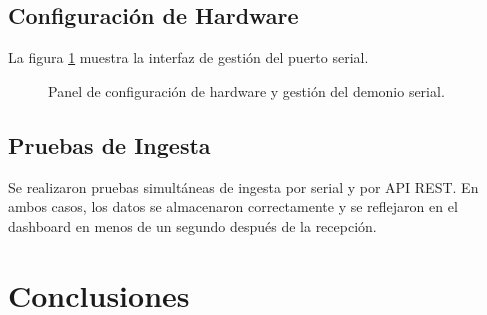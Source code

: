 \documentclass[12pt,a4paper]{report}
\begin{document}
\section{Configuración de Hardware}
\label{sec:resultado-hardware}

La figura \ref{fig:hardware} muestra la interfaz de gestión del puerto serial.

\begin{figure}[H]
    \centering
    \caption{Panel de configuración de hardware y gestión del demonio serial.}
    \label{fig:hardware}
\end{figure}

\section{Pruebas de Ingesta}
\label{sec:pruebas-ingesta}

Se realizaron pruebas simultáneas de ingesta por serial y por API REST. En ambos casos, los datos se almacenaron correctamente y se reflejaron en el dashboard en menos de un segundo después de la recepción.

\chapter{Conclusiones}
\label{ch:conclusiones}
\end{document}
